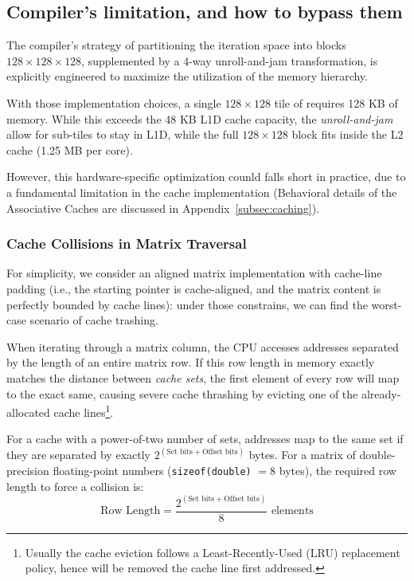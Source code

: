 \subsection{Compiler's limitation, and how to bypass them}

The compiler’s strategy of partitioning the iteration space into blocks $128 \times 128 \times 128$, supplemented by a 4-way unroll-and-jam transformation, is explicitly engineered to maximize the utilization of the  memory hierarchy. 

With those implementation choices, a single $128 \times 128$ tile of requires 128 KB of memory. While this exceeds the 48 KB L1D cache capacity, the \emph{unroll-and-jam} allow for sub-tiles to stay in L1D, while the full $128 \times 128$ block fits inside the L2 cache (1.25 MB per core). 

However, this hardware-specific optimization counld falls short in practice, due to a fundamental limitation in the cache implementation (Behavioral details of the Associative Caches are discussed in Appendix~\ref{subsec:caching}). 

\subsubsection{Cache Collisions in Matrix Traversal}
For simplicity, we consider an aligned matrix implementation with cache-line padding (i.e., the starting pointer is cache-aligned, and the matrix content is perfectly bounded by cache lines): under those constrains, we can find the worst-case scenario of cache trashing.

When iterating through a matrix column, the CPU accesses addresses separated by the length of an entire matrix row. If this row length in memory exactly matches the distance between \emph{cache sets}, the first element of every row will map to the exact same, causing severe cache thrashing by evicting one of the already-allocated cache lines\footnote{Usually the cache eviction follows a Least-Recently-Used (LRU) replacement policy, hence will be removed the cache line first addressed.}.

For a cache with a power-of-two number of sets, addresses map to the same set if they are separated by exactly $2^{(\text{Set bits} + \text{Offset bits})}$ bytes. For a matrix of double-precision floating-point numbers (\texttt{sizeof(double)} $= 8$ bytes), the required row length to force a collision is:
$$ \text{Row Length} = \frac{2^{(\text{Set bits} + \text{Offset bits})}}{8} \text{ elements} $$

